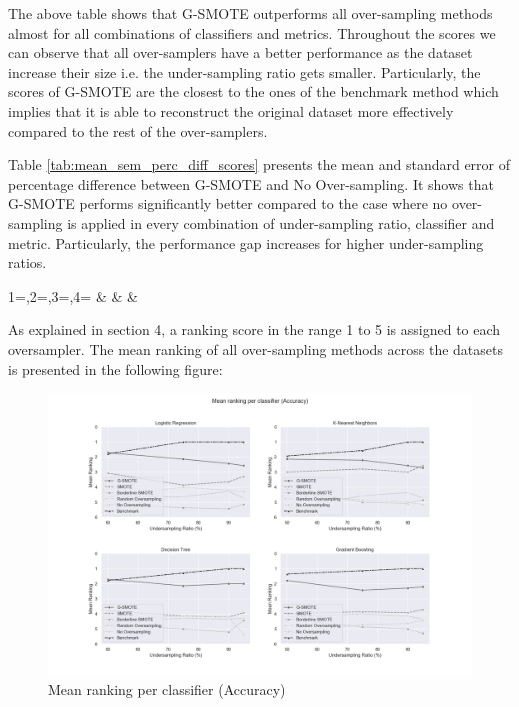 \documentclass[parskip=full]{scrartcl}
\begin{document}
The above table shows that G-SMOTE outperforms all over-sampling methods almost
for all combinations of classifiers and metrics. Throughout the scores we can
observe that all over-samplers have a better performance as the dataset increase
their size i.e. the under-sampling ratio gets smaller.  Particularly, the scores
of G-SMOTE are the closest to the ones of the benchmark method which implies
that it is able to reconstruct the original dataset more effectively compared to
the rest of the over-samplers.

Table \ref{tab:mean_sem_perc_diff_scores} presents the mean and standard error
of percentage difference between G-SMOTE and No Over-sampling. It shows that
G-SMOTE performs significantly better compared to the case where no
over-sampling is applied in every combination of under-sampling ratio,
classifier and metric. Particularly, the performance gap increases for higher
under-sampling ratios.

\begin{center}
	\begin{footnotesize}
		{1=\ratio,2=\classifier,3=\metric,4=\difference}
		{\ratio & \classifier & \metric & \difference}
	\end{footnotesize}
	\addtocounter{table}{-1}
	\label{tab:mean_sem_perc_diff_scores}
\end{center}

As explained in section 4, a ranking score in the range 1 to 5 is assigned to
each oversampler. The mean ranking of all over-sampling methods across the
datasets is presented in the following figure: 

\begin{figure}[H]
	\includegraphics[width=1\linewidth]
		{../analysis/mean_ranking_per_classifier_accuracy}
	\caption{Mean ranking per classifier (Accuracy)}
	\label{fig:mean_ranking_per_classifier_accuracy}
\end{figure}
\end{document}
